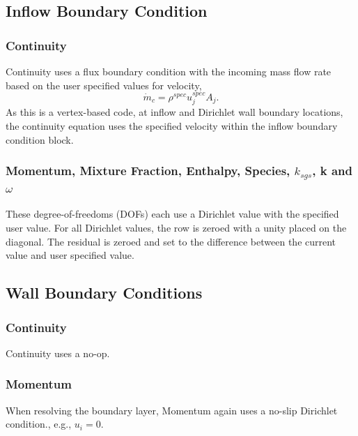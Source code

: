 \subsection{Inflow Boundary Condition}

\subsubsection{Continuity}
Continuity uses a flux boundary condition with the incoming
mass flow rate based on the user specified values for velocity,
\begin{equation}
  \dot{m}_c = \rho^{spec} u^{spec}_j A_j.
\end{equation}
As this is a vertex-based code, at inflow and Dirichlet wall boundary locations,
the continuity equation uses the specified velocity within the inflow boundary condition
block.

\subsubsection{Momentum, Mixture Fraction, Enthalpy, Species, $k_{sgs}$, k and $\omega$}
These degree-of-freedoms (DOFs) each use a Dirichlet value with the specified user value.
For all Dirichlet values, the row is zeroed with a unity placed
on the diagonal. The residual is zeroed and set to the difference
between the current value and user specified value.

\subsection{Wall Boundary Conditions}

\subsubsection{Continuity}
Continuity uses a no-op.

\subsubsection{Momentum}
When resolving the boundary layer, Momentum again uses a no-slip 
Dirichlet condition., e.g., $u_i = 0$. 


